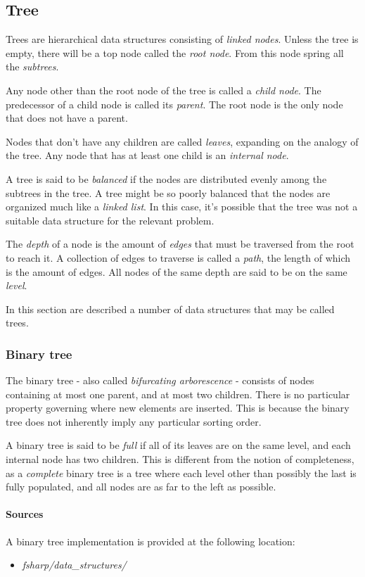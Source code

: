\documentclass{article}
\begin{document}
\newpage


\subsection{Tree}
Trees are hierarchical data structures consisting of {\em linked nodes}.
Unless the tree is empty, there will be a top node called the {\em root node}.
From this node spring all the {\em subtrees}.

Any node other than the root node of the tree is called a {\em child node}.
The predecessor of a child node is called its {\em parent}.
The root node is the only node that does not have a parent.

Nodes that don't have any children are called {\em leaves}, expanding on the analogy of the tree.
Any node that has at least one child is an {\em internal node}.

A tree is said to be {\em balanced} if the nodes are distributed evenly among the subtrees in the tree.
A tree might be so poorly balanced that the nodes are organized much like a {\em linked list}.
In this case, it's possible that the tree was not a suitable data structure for the relevant problem.

The {\em depth} of a node is the amount of {\em edges} that must be traversed from the root to reach it.
A collection of edges to traverse is called a {\em path}, the length of which is the amount of edges.
All nodes of the same depth are said to be on the same {\em level}.

In this section are described a number of data structures that may be called trees.


\subsubsection{Binary tree}
The binary tree - also called {\em bifurcating arborescence} - consists of nodes containing at most one parent,
and at most two children. There is no particular property governing where new elements are inserted.
This is because the binary tree does not inherently imply any particular sorting order.

A binary tree is said to be {\em full} if all of its leaves are on the same level,
and each internal node has two children. This is different from the notion of completeness,
as a {\em complete} binary tree is a tree where each level other than possibly the last is fully populated,
and all nodes are as far to the left as possible.

\paragraph{Sources}
A binary tree implementation is provided at the following location:
\begin{itemize}
\item{{\em fsharp/data\_structures/}}
\end{itemize}
\end{document}
